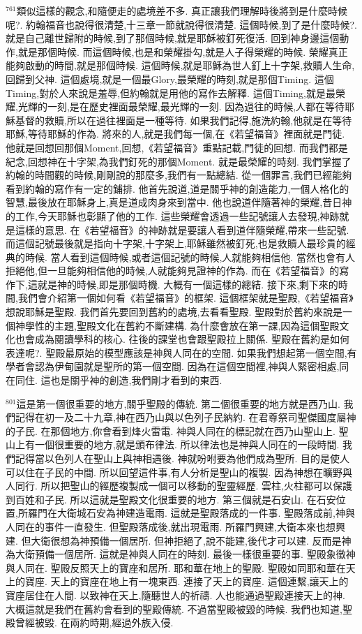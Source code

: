 \documentclass{book}
\begin{document}
$^{761}$類似這樣的觀念,和隨便走的處境差不多.
真正讓我們理解時後將到是什麼時候呢?.
約翰福音也說得很清楚,十三章一節就說得很清楚.
這個時候,到了是什麼時候?.
就是自己離世歸附的時候,到了那個時候,就是耶穌被釘死復活.
回到神身邊這個動作,就是那個時候.
而這個時候,也是和榮耀掛勾,就是人子得榮耀的時候.
榮耀真正能夠啟動的時間,就是那個時候.
這個時候,就是耶穌為世人釘上十字架,救贖人生命,回歸到父神.
這個處境,就是一個最Glory,最榮耀的時刻,就是那個Timing.
這個Timing,對於人來說是羞辱,但約翰就是用他的寫作去解釋.
這個Timing,就是最榮耀,光輝的一刻,是在歷史裡面最榮耀,最光輝的一刻.
因為過往的時候,人都在等待耶穌基督的救贖,所以在過往裡面是一種等待.
如果我們記得,施洗約翰,他就是在等待耶穌,等待耶穌的作為.
將來的人,就是我們每一個,在《若望福音》裡面就是門徒.
他就是回想回那個Moment,回想,《若望福音》重點記載,門徒的回想.
而我們都是紀念,回想神在十字架,為我們釘死的那個Moment.
就是最榮耀的時刻.
我們掌握了約翰的時間觀的時候,剛剛說的那麼多,我們有一點總結.
從一個罪言,我們已經能夠看到約翰的寫作有一定的鋪排.
他首先說道,道是關乎神的創造能力,一個人格化的智慧,最後放在耶穌身上,真是道成肉身來到當中.
他也說道伴隨著神的榮耀,昔日神的工作,今天耶穌也彰顯了他的工作.
這些榮耀會透過一些記號讓人去發現,神跡就是這樣的意思.
在《若望福音》的神跡就是要讓人看到道伴隨榮耀,帶來一些記號.
而這個記號最後就是指向十字架,十字架上,耶穌雖然被釘死,也是救贖人最珍貴的經典的時候.
當人看到這個時候,或者這個記號的時候,人就能夠相信他.
當然也會有人拒絕他,但一旦能夠相信他的時候,人就能夠見證神的作為.
而在《若望福音》的寫作下,這就是神的時候,即是那個時機.
大概有一個這樣的總結.
接下來,剩下來的時間,我們會介紹第一個如何看《若望福音》的框架.
這個框架就是聖殿,《若望福音》想說耶穌是聖殿.
我們首先要回到舊約的處境,去看看聖殿.
聖殿對於舊約來說是一個神學性的主題,聖殿文化在舊約不斷建構.
為什麼會放在第一課,因為這個聖殿文化也會成為閱讀學科的核心.
往後的課堂也會跟聖殿拉上關係.
聖殿在舊約是如何表達呢?.
聖殿最原始的模型應該是神與人同在的空間.
如果我們想起第一個空間,有學者會認為伊甸園就是聖所的第一個空間.
因為在這個空間裡,神與人緊密相處,同在同住.
這也是關乎神的創造,我們剛才看到的東西.

$^{801}$這是第一個很重要的地方,關乎聖殿的傳統.
第二個很重要的地方就是西乃山.
我們記得在初一及二十九章,神在西乃山與以色列子民納約.
在君尊祭司聖傑國度屬神的子民.
在那個地方,你會看到烽火雷電.
神與人同在的標記就在西乃山聖山上.
聖山上有一個很重要的地方,就是頒布律法.
所以律法也是神與人同在的一段時間.
我們記得當以色列人在聖山上與神相遇後.
神就吩咐要為他們成為聖所.
目的是使人可以住在子民的中間.
所以回望這件事,有人分析是聖山的複製.
因為神想在曠野與人同行.
所以把聖山的經歷複製成一個可以移動的聖靈經歷.
雲柱,火柱都可以保護到百姓和子民.
所以這就是聖殿文化很重要的地方.
第三個就是石安山.
在石安位置,所羅門在大衛城石安為神建造電雨.
這就是聖殿落成的一件事.
聖殿落成前,神與人同在的事件一直發生.
但聖殿落成後,就出現電雨.
所羅門興建,大衛本來也想興建.
但大衛很想為神預備一個居所.
但神拒絕了,說不能建,後代才可以建.
反而是神為大衛預備一個居所.
這就是神與人同在的時刻.
最後一樣很重要的事.
聖殿象徵神與人同在.
聖殿反照天上的寶座和居所.
耶和華在地上的聖殿.
聖殿如同耶和華在天上的寶座.
天上的寶座在地上有一塊東西.
連接了天上的寶座.
這個連繫,讓天上的寶座居住在人間.
以致神在天上,隨聽世人的祈禱.
人也能通過聖殿連接天上的神.
大概這就是我們在舊約會看到的聖殿傳統.
不過當聖殿被毀的時候.
我們也知道,聖殿曾經被毀.
在兩約時期,經過外族入侵.
\end{document}
